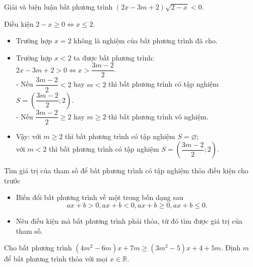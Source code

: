 \begin{bt}%
	Giải và biện luận bất phương trình $\left(2x-3m+2\right)\sqrt{2-x} < 0$.
	\loigiai
	{
		Điều kiện $2-x \geq 0 \Leftrightarrow x \leq 2$.
		\begin{itemize}
			\item Trường hợp $x=2$ không là nghiệm của bất phương trình đã cho.
			\item Trường hợp $x<2$ ta được bất phương trình:\\
			$2x-3m+2 >0 \Leftrightarrow x > \dfrac{3m-2}{2}$.\\
			- Nếu $\dfrac{3m-2}{2} < 2$ hay $m < 2$ thì bất phương trình có tập nghiệm $S = \left(\dfrac{3m-2}{2}; 2\right)$.\\
			- Nếu $\dfrac{3m-2}{2} \geq 2$ hay $m \geq 2$ thì bất phương trình vô nghiệm.
			\item Vậy: với $m \geq 2$ thì bất phương trình có tập nghiệm $S = \varnothing$;\\
			với $m < 2$ thì bất phương trình có tập nghiệm $S = \left(\dfrac{3m-2}{2}; 2\right)$.
		\end{itemize}
	}
\end{bt}
\begin{dang}{Tìm giá trị của tham số để bất phương trình có tập nghiệm thỏa điều kiện cho trước}
	\begin{itemize}
		\item Biến đổi bất phương trình về một trong bốn dạng sau
		$$ax+b>0,ax+b<0,ax+b \ge 0, ax+b \le 0.$$
		\item Nêu điều kiện mà bất phương trình phải thỏa, từ đó tìm được giá trị của tham số.
	\end{itemize}
\end{dang}
\begin{vd}%
	Cho bất phương trình $(4m^2-6m)x+7m \ge (3m^2-5)x+4+5m$. Định $m$ để bất phương trình thỏa với mọi $x \in \mathbb{R}.$
\end{vd}

